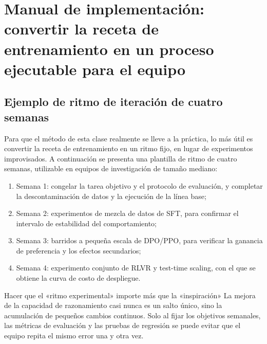 \section{Manual de implementación: convertir la receta de entrenamiento en un proceso ejecutable para el equipo}

\subsection{Ejemplo de ritmo de iteración de cuatro semanas}
Para que el método de esta clase realmente se lleve a la práctica, lo más útil es convertir la receta de entrenamiento en un ritmo fijo, en lugar de experimentos improvisados. A continuación se presenta una plantilla de ritmo de cuatro semanas, utilizable en equipos de investigación de tamaño mediano:
\begin{enumerate}
    \item Semana 1: congelar la tarea objetivo y el protocolo de evaluación, y completar la descontaminación de datos y la ejecución de la línea base;
    \item Semana 2: experimentos de mezcla de datos de SFT, para confirmar el intervalo de estabilidad del comportamiento;
    \item Semana 3: barridos a pequeña escala de DPO/PPO, para verificar la ganancia de preferencia y los efectos secundarios;
    \item Semana 4: experimento conjunto de RLVR y test-time scaling, con el que se obtiene la curva de costo de despliegue.
\end{enumerate}

\begin{importantbox}{Hacer que el «ritmo experimental» importe más que la «inspiración»}
La mejora de la capacidad de razonamiento casi nunca es un salto único, sino la acumulación de pequeños cambios continuos. Solo al fijar los objetivos semanales, las métricas de evaluación y las pruebas de regresión se puede evitar que el equipo repita el mismo error una y otra vez.
\end{importantbox}

